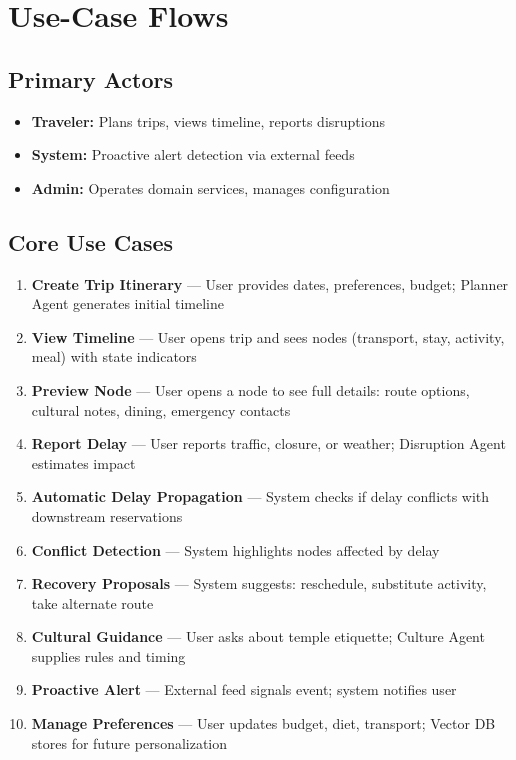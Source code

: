 \documentclass[11pt]{article}
\begin{document}
\section{Use-Case Flows}

\subsection{Primary Actors}
\begin{itemize}
    \item \textbf{Traveler:} Plans trips, views timeline, reports disruptions
    \item \textbf{System:} Proactive alert detection via external feeds
    \item \textbf{Admin:} Operates domain services, manages configuration
\end{itemize}

\subsection{Core Use Cases}

\begin{enumerate}
    \item \textbf{Create Trip Itinerary} — User provides dates, preferences, budget; Planner Agent generates initial timeline
    \item \textbf{View Timeline} — User opens trip and sees nodes (transport, stay, activity, meal) with state indicators
    \item \textbf{Preview Node} — User opens a node to see full details: route options, cultural notes, dining, emergency contacts
    \item \textbf{Report Delay} — User reports traffic, closure, or weather; Disruption Agent estimates impact
    \item \textbf{Automatic Delay Propagation} — System checks if delay conflicts with downstream reservations
    \item \textbf{Conflict Detection} — System highlights nodes affected by delay
    \item \textbf{Recovery Proposals} — System suggests: reschedule, substitute activity, take alternate route
    \item \textbf{Cultural Guidance} — User asks about temple etiquette; Culture Agent supplies rules and timing
    \item \textbf{Proactive Alert} — External feed signals event; system notifies user
    \item \textbf{Manage Preferences} — User updates budget, diet, transport; Vector DB stores for future personalization
\end{enumerate}
\end{document}
